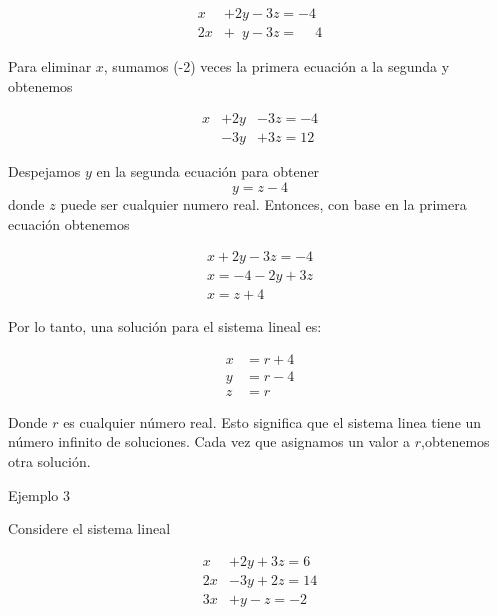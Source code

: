 \documentclass{article}
\begin{document}
\begin{equation*}
    \begin{aligned}
            x & +2y -3z = -4\\
            2x & +\phantom{2}y -3z = \phantom{-} 4
    \end{aligned}
\end{equation*}

Para eliminar $x$, sumamos (-2) veces la primera ecuación a la segunda y obtenemos

\begin{equation*}
    \begin{aligned}
            x & +2y &-3z = -4\\
            & -3y &+3z = 12
    \end{aligned}
\end{equation*}

Despejamos $y$ en la segunda ecuación para obtener $$y=z-4$$ donde $z$ puede ser cualquier numero real. Entonces, con base en la primera ecuación obtenemos 

\begin{equation*}
    \begin{matrix}
            x + 2y - 3z = -4\\
            x = -4 -2y +3z\\
            x= z + 4
    \end{matrix}
\end{equation*}

Por lo tanto, una solución para el sistema lineal es: 

\begin{equation*}
    \begin{aligned}
            x & = r + 4\\
            y & = r - 4\\
            z &= r
    \end{aligned}
\end{equation*}

Donde $r$ es cualquier número real. Esto significa que el sistema linea tiene un número infinito de soluciones. Cada vez que asignamos un valor a $r$,obtenemos otra solución.

\begin{large}
    Ejemplo 3
\end{large}
Considere el sistema lineal

\begin{equation*}
    \begin{aligned}
            x & +2y + 3z = 6\\
            2x & -3y + 2z = 14\\
            3x & +y - z = -2
    \end{aligned}
\end{equation*}
\end{document}
